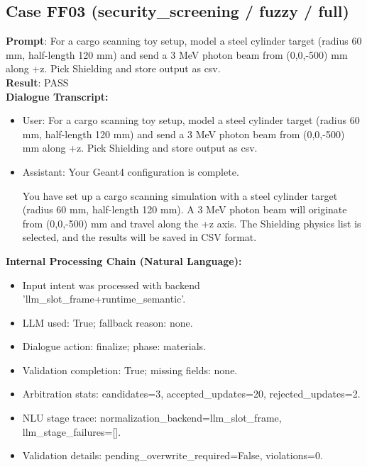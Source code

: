 \documentclass[11pt]{ctexart}
\begin{document}
\subsection{Case FF03 (security\_screening / fuzzy / full)}
\textbf{Prompt}: For a cargo scanning toy setup, model a steel cylinder target (radius 60 mm, half-length 120 mm) and send a 3 MeV photon beam from (0,0,-500) mm along +z. Pick Shielding and store output as csv.\\
\textbf{Result}: PASS\\
\textbf{Dialogue Transcript:}
\begin{itemize}
\item User: For a cargo scanning toy setup, model a steel cylinder target (radius 60 mm, half-length 120 mm) and send a 3 MeV photon beam from (0,0,-500) mm along +z. Pick Shielding and store output as csv.
\item Assistant: Your Geant4 configuration is complete.

You have set up a cargo scanning simulation with a steel cylinder target (radius 60 mm, half-length 120 mm). A 3 MeV photon beam will originate from (0,0,-500) mm and travel along the +z axis. The Shielding physics list is selected, and the results will be saved in CSV format.
\end{itemize}
\textbf{Internal Processing Chain (Natural Language):}
\begin{itemize}
\item Input intent was processed with backend 'llm\_slot\_frame+runtime\_semantic'.
\item LLM used: True; fallback reason: none.
\item Dialogue action: finalize; phase: materials.
\item Validation completion: True; missing fields: none.
\item Arbitration stats: candidates=3, accepted\_updates=20, rejected\_updates=2.
\item NLU stage trace: normalization\_backend=llm\_slot\_frame, llm\_stage\_failures=[].
\item Validation details: pending\_overwrite\_required=False, violations=0.
\end{itemize}
\end{document}
